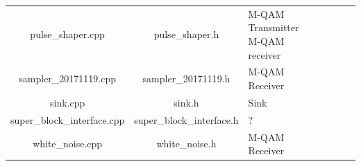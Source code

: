 \begin{table}[]
\begin{tabular}{|c|c|p{35mm}|c|ccc}
		pulse\_shaper.cpp & pulse\_shaper.h & M-QAM Transmitter \newline M-QAM receiver & \checkmark & \\ \cline{1-4}
		sampler\_20171119.cpp & sampler\_20171119.h & M-QAM Receiver & \checkmark & \\ \cline{1-4}
		sink.cpp & sink.h & Sink & \checkmark & \\ \cline{1-4}
		super\_block\_interface.cpp & super\_block\_interface.h & ? & \checkmark & \\ \cline{1-4}
		white\_noise.cpp & white\_noise.h & M-QAM Receiver & \checkmark & \\ \cline{1-4}
	\end{tabular}
	\label{table:files}
\end{table}

